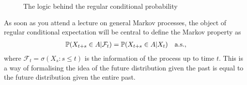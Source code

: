 \begin{figure}[h]
\begin{center}
  \caption*{The logic behind the regular conditional probability}
\end{center}
\end{figure}


\begin{lwarnhinweis}
As soon as you attend a lecture on general Markov processes, the object of regular conditional expectation will be central to define the Markov property as
\begin{align*}
	\P(X_{t+s}\in A| \mathcal F_t)=\P(X_{t+s}\in A|X_t)\quad\text{a.s.},
\end{align*}
where $\mathcal F_t=\sigma(X_s:s\leq t)$ is the information of the process up to time $t$. This is a way of formalising the idea of the future distribution given the past is equal to the future distribution given the entire past.
\end{lwarnhinweis}

